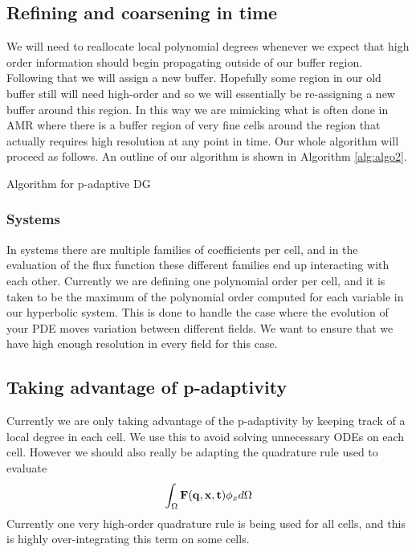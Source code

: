 \documentclass[10]{amsart}
\begin{document}
\subsection{Refining and coarsening in time}
We will need to reallocate local polynomial degrees whenever we expect that high order information
 should begin propagating outside of our buffer region. Following that we will assign a new buffer.
Hopefully some region in our old buffer still will need high-order and so we will essentially be re-assigning a new
buffer around this region. In this way we are mimicking what is often done in AMR where there is a buffer region of
very fine cells around the region that actually requires high resolution at any point in time\cite{berger1998adaptive}.
Our whole algorithm will proceed as follows. An outline of our algorithm is shown in Algorithm \ref{alg:algo2}.
\begin{algorithm}
\caption{Algorithm for p-adaptive DG}
\begin{algorithmic}[1]
\EndFor
\EndWhile
{}
\EndFor
{}
\EndWhile

\end{algorithmic}\label{alg:algo2}
\end{algorithm}

\subsubsection{Systems}
In systems there are multiple families of coefficients per cell, and in the evaluation of the 
flux function these different families end up interacting with each other. Currently we are defining
one polynomial order per cell, and it is taken to be the maximum of the polynomial order computed for each variable
in our hyperbolic system. This is done to handle the case where the evolution of your PDE moves variation between different
fields. We want to ensure that we have high enough resolution in every field for this case. 

\subsection{Taking advantage of p-adaptivity}
Currently we are only taking advantage of the p-adaptivity by keeping track
of a local degree in each cell. We use this to avoid solving unnecessary ODEs
on each cell. However we should also really be adapting the quadrature rule used to evaluate
$$\int_{\Omega}{\bf F(q,x,t)} \phi_x d\Omega$$
Currently one very high-order quadrature rule is being used for all cells, and this
is highly over-integrating this term on some cells. 
\end{document}
